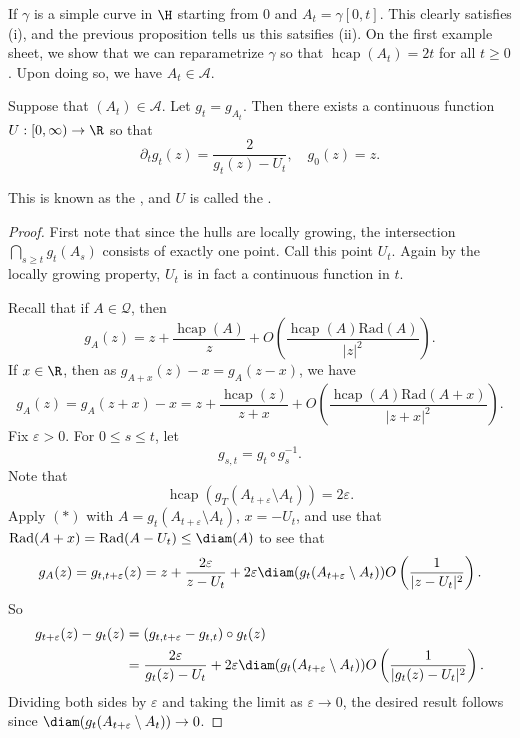 \documentclass[a4paper]{article}
\DeclareMathOperator\hcap{hcap}
\newcommand\rad{\mathrm{Rad}}
\begin{document}
\begin{eg}
  If $\gamma$ is a simple curve in $\H$ starting from $0$ and $A_t = \gamma[0, t]$. This clearly satisfies (i), and the previous proposition tells us this satsifies (ii). On the first example sheet, we show that we can reparametrize $\gamma$ so that $\hcap(A_t) = 2t$ for all $t \geq 0$. Upon doing so, we have $A_t \in \mathcal{A}$.
\end{eg}

\begin{thm} %
  Suppose that $(A_t) \in \mathcal{A}$. Let $g_t = g_{A_t}$. Then there exists a continuous function $U: [0, \infty) \to \R$ so that
  \[
    \partial_t g_t (z) = \frac{2}{g_t(z) - U_t},\quad g_0(z) = z.
  \]
\end{thm}
This is known as the , and $U$ is called the .

\begin{proof}
  First note that since the hulls are locally growing, the intersection $\bigcap_{s \geq t} g_t(A_s)$ consists of exactly one point. Call this point $U_t$. Again by the locally growing property, $U_t$ is in fact a continuous function in $t$.

  Recall that if $A \in \mathcal{Q}$, then
  \[
    g_A(z) = z + \frac{\hcap(A)}{z} + O\left(\frac{\hcap(A) \rad(A)}{|z|^2}\right).
  \]
  If $x \in \R$, then as $g_{A + x}(z) - x = g_A(z - x)$, we have
  \[
    g_A(z) = g_A(z + x) - x = z + \frac{\hcap(z)}{z + x} + O\left(\frac{\hcap(A) \rad(A + x)}{|z + x|^2}\right).\tag{$*$}
  \]
  Fix $\varepsilon > 0$. For $0 \leq s \leq t$, let
  \[
    g_{s, t} = g_t \circ g_s^{-1}.
  \]
  Note that
  \[
    \hcap(g_T(A_{t + \varepsilon} \setminus A_t)) = 2 \varepsilon.
  \]
  Apply $(*)$ with $A = g_t(A_{t + \varepsilon} \setminus A_t)$, $x = -U_t$, and use that $\rad(A + x) = \rad(A - U_t) \leq \diam(A)$ to see that
  \[
    g_A(z) = g_{t, t + \varepsilon}(z) = z + \frac{2\varepsilon}{z - U_t} + 2 \varepsilon \diam(g_t(A_{t + \varepsilon} \setminus A_t))O\left(\frac{1}{|z - U_t|^2}\right).
  \]
  So
  \begin{align*}
    g_{t + \varepsilon}(z) - g_t(z) &= (g_{t, t + \varepsilon} - g_{t, t}) \circ g_t(z)\\
    &= \frac{2\varepsilon}{g_t(z) - U_t} + 2\varepsilon \diam(g_t(A_{t + \varepsilon} \setminus A_t)) O\left(\frac{1}{|g_t(z) - U_t|^2}\right).
  \end{align*}
  Dividing both sides by $\varepsilon$ and taking the limit as $\varepsilon \to 0$, the desired result follows since $\diam(g_t(A_{t + \varepsilon} \setminus A_t)) \to 0$.
\end{proof}
\end{document}
